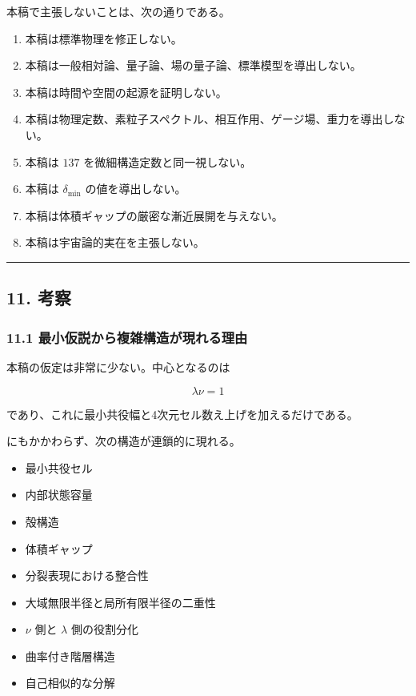 \documentclass[
]{ltjsarticle}
\providecommand{\tightlist}{%
  \setlength{\itemsep}{0pt}\setlength{\parskip}{0pt}}
\begin{document}
本稿で主張しないことは、次の通りである。

\begin{enumerate}
\def\labelenumi{\arabic{enumi}.}
\tightlist
\item
  本稿は標準物理を修正しない。
\item
  本稿は一般相対論、量子論、場の量子論、標準模型を導出しない。
\item
  本稿は時間や空間の起源を証明しない。
\item
  本稿は物理定数、素粒子スペクトル、相互作用、ゲージ場、重力を導出しない。
\item
  本稿は \(137\) を微細構造定数と同一視しない。
\item
  本稿は \(\delta_{\min}\) の値を導出しない。
\item
  本稿は体積ギャップの厳密な漸近展開を与えない。
\item
  本稿は宇宙論的実在を主張しない。
\end{enumerate}

\begin{center}\rule{0.5\linewidth}{0.5pt}\end{center}

\subsection{11. 考察}\label{ux8003ux5bdf}

\subsubsection{11.1
最小仮説から複雑構造が現れる理由}\label{ux6700ux5c0fux4eeeux8aacux304bux3089ux8907ux96d1ux69cbux9020ux304cux73feux308cux308bux7406ux7531}

本稿の仮定は非常に少ない。中心となるのは

\[
\lambda\nu=1
\]

であり、これに最小共役幅と4次元セル数え上げを加えるだけである。

にもかかわらず、次の構造が連鎖的に現れる。

\begin{itemize}
\tightlist
\item
  最小共役セル
\item
  内部状態容量
\item
  殻構造
\item
  体積ギャップ
\item
  分裂表現における整合性
\item
  大域無限半径と局所有限半径の二重性
\item
  \(\nu\) 側と \(\lambda\) 側の役割分化
\item
  曲率付き階層構造
\item
  自己相似的な分解
\end{itemize}
\end{document}
